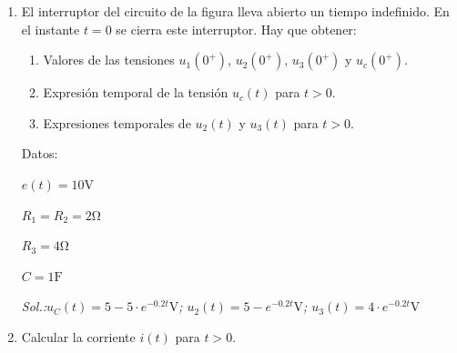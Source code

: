 \begin{enumerate}
\item El interruptor del circuito de la figura lleva abierto un tiempo
  indefinido. En el instante $t= 0$ se cierra este interruptor. Hay
  que obtener:
  \begin{enumerate}
  \item Valores de las tensiones $u_1(0^+)$, $u_2(0^+)$, $u_3(0^+)$ y
    $u_c(0^+)$.
  \item Expresión temporal de la tensión $u_c(t)$ para $t > 0$.
  \item Expresiones temporales de $u_2(t)$ y $u_3(t)$ para $t > 0$.
  \end{enumerate}

\begin{minipage}{0.5\linewidth}
\end{minipage}
\begin{minipage}{0.5\linewidth}
  Datos:

  $e(t) = 10\unit{\volt}$
  
  $R_1 = R_2 = 2 \unit{\ohm}$

  $R_3= 4 \unit{\ohm}$

  $C = 1 \unit{\farad}$
\end{minipage}

\emph{Sol.:$u_C(t) = 5 - 5 \cdot e^{-0.2t} \unit{\volt}$;
  $u_2(t) = 5 - e^{-0.2t} \unit{\volt}$;
  $u_3(t) = 4 \cdot e^{-0.2t} \unit{\volt}$}

\item Calcular la corriente $i(t)$ para $t > 0$.


\end{enumerate}
